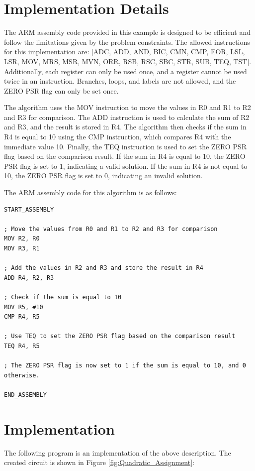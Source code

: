 \section{Implementation Details}

The ARM assembly code provided in this example is designed to be efficient and follow the limitations given by the problem constraints. The allowed instructions for this implementation are: [ADC, ADD, AND, BIC, CMN, CMP, EOR, LSL, LSR, MOV, MRS, MSR, MVN, ORR, RSB, RSC, SBC, STR, SUB, TEQ, TST]. Additionally, each register can only be used once, and a register cannot be used twice in an instruction. Branches, loops, and labels are not allowed, and the ZERO PSR flag can only be set once.

The algorithm uses the MOV instruction to move the values in R0 and R1 to R2 and R3 for comparison. The ADD instruction is used to calculate the sum of R2 and R3, and the result is stored in R4. The algorithm then checks if the sum in R4 is equal to 10 using the CMP instruction, which compares R4 with the immediate value 10. Finally, the TEQ instruction is used to set the ZERO PSR flag based on the comparison result. If the sum in R4 is equal to 10, the ZERO PSR flag is set to 1, indicating a valid solution. If the sum in R4 is not equal to 10, the ZERO PSR flag is set to 0, indicating an invalid solution.

The ARM assembly code for this algorithm is as follows:

\begin{verbatim}
START_ASSEMBLY

; Move the values from R0 and R1 to R2 and R3 for comparison
MOV R2, R0
MOV R3, R1

; Add the values in R2 and R3 and store the result in R4
ADD R4, R2, R3

; Check if the sum is equal to 10
MOV R5, #10
CMP R4, R5

; Use TEQ to set the ZERO PSR flag based on the comparison result
TEQ R4, R5

; The ZERO PSR flag is now set to 1 if the sum is equal to 10, and 0 otherwise.

END_ASSEMBLY
\end{verbatim}



\section{Implementation}

The following program is an implementation of the above description. The created circuit is shown in Figure \ref{fig:Quadratic_Assignment}:

